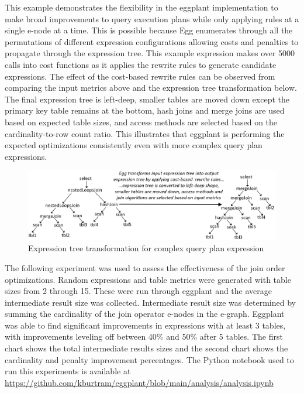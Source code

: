 \documentclass{article}
\begin{document}
This example demonstrates the flexibility in the eggplant implementation to make broad improvements
to query execution plans while only applying rules at a single e-node at a time.  This is possible because Egg
enumerates through all the permutations of different expression configurations allowing costs
and penalties to propagate through the expression tree.  This example expression makes over 5000 calls into
cost functions as it applies the rewrite rules to generate candidate expressions.  The effect of the cost-based
rewrite rules can be observed from comparing the input metrics above and the expression tree transformation below.
The final expression tree is left-deep, smaller tables are moved down except the primary key table remains at the bottom, 
hash joins and merge joins are used based on expected table sizes, and access methods are selected 
based on the cardinality-to-row count ratio.  This illustrates that eggplant is performing the 
expected optimizations consistently even with more complex query plan expressions.

\begin{figure}[H]
\centering
\begin{minipage}[b]{1.0\textwidth}
    \includegraphics[width=\textwidth]{complex-transform.png}
    \caption{Expression tree transformation for complex query plan expression}
\end{minipage}
\hfill
\end{figure}

The following experiment was used to assess the effectiveness of the join order optimizations.  Random expressions and 
table metrics were generated with table sizes from 2 through 15.  These were run through eggplant and the average
intermediate result size was collected.  Intermediate result size was determined by summing the cardinality of the
join operator e-nodes in the e-graph.  Eggplant was able to find significant improvements in expressions with at
least 3 tables, with improvements leveling off between 40\% and 50\% after 5 tables.  The first chart shows the
total intermediate results sizes and the second chart shows the cardinality and penalty improvement percentages.  
The Python notebook used to run this experiments is available at
\href{https://github.com/kburtram/eggplant/blob/main/analysis/analysis.ipynb}{https://github.com/kburtram/eggplant/blob/main/analysis/analysis.ipynb}
\end{document}
